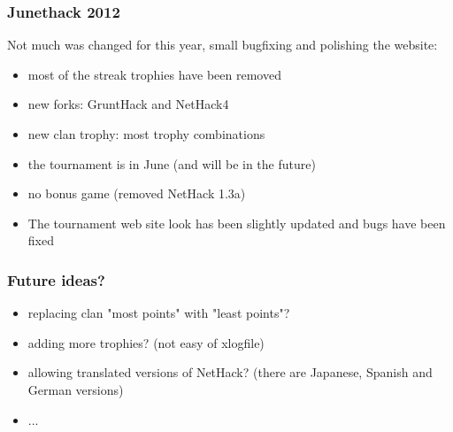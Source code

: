 \documentclass[handout]{beamer}
\begin{document}



\begin{frame}
\frametitle{Junethack 2012}
  Not much was changed for this year, small bugfixing and polishing the website:\pause
  \begin{itemize}[<+->]
    \item most of the streak trophies have been removed
    \item new forks: GruntHack and NetHack4
    \item new clan trophy: most trophy combinations
    \item the tournament is in June (and will be in the future)
    \item no bonus game (removed NetHack 1.3a)
    \item The tournament web site look has been slightly updated and bugs have been fixed
  \end{itemize}
\end{frame}

\begin{frame}
\frametitle{Future ideas?}
  \begin{itemize}[<+->]
    \item replacing clan "most points" with "least points"?
    \item adding more trophies? (not easy of xlogfile)
    \item allowing translated versions of NetHack? (there are Japanese, Spanish and
German versions)
    \item ...
  \end{itemize}
\end{frame}
\end{document}
